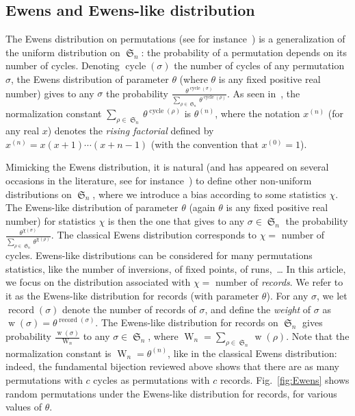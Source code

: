 \documentclass[proceedings]{aofa}
\DeclareMathOperator{\sym}{\mathfrak{S}}
\DeclareMathOperator{\weight}{w}
\DeclareMathOperator{\Weight}{W}
\DeclareMathOperator{\cyc}{cycle}
\DeclareMathOperator{\rec}{record}
\newcommand{\rfact}[2]{#1^{(#2)}}
\begin{document}
\subsection{Ewens and Ewens-like distribution}

The Ewens distribution on permutations (see for instance~\cite[Ch. 4 \& 5]{Arratia}) is a generalization of the uniform distribution on $\sym_{n}$: 
the probability of a permutation depends on its number of cycles. 
Denoting $\cyc(\sigma)$ the number of cycles of any permutation $\sigma$, 
the Ewens distribution of parameter $\theta$ (where $\theta$ is any fixed positive real number) 
gives to any $\sigma$ the probability $\frac{\theta^{\cyc(\sigma)}}{\sum_{\rho\in\sym_{n}} \theta^{\cyc(\rho)}}$. 
As seen in~\cite[Ch. 5]{Arratia}, the normalization constant $\sum_{\rho\in\sym_{n}} \theta^{\cyc(\rho)}$ is $\rfact\theta n$, 
where the notation $\rfact{x}{n}$ (for any real $x$) denotes the \emph{rising factorial} defined by
$\rfact{x}{n}=x(x + 1)\cdots(x + n-1)$ (with the convention that $\rfact{x}{0}=1$).

Mimicking the Ewens distribution, it is natural (and has appeared on several occasions in the literature, see for instance~\cite[Example 12]{Borodin}) 
to define other non-uniform distributions on $\sym_{n}$, 
where we introduce a bias according to some statistics $\chi$. 
The Ewens-like distribution of parameter $\theta$ (again $\theta$ is any fixed positive real number) 
for statistics $\chi$ 
is then the one that gives to any $\sigma \in \sym_n$ the probability $\frac{\theta^{\chi(\sigma)}}{\sum_{\rho\in\sym_{n}} \theta^{\chi(\rho)}}$. 
The classical Ewens distribution corresponds to $\chi = $ number of cycles. 
Ewens-like distributions can be considered for many permutations statistics, like the number of inversions, of fixed points, of runs,~\dots 
In this article, we focus on the distribution associated with $\chi = $ number of \emph{records}. 
We refer to it as the Ewens-like distribution for records (with parameter $\theta$).
For any $\sigma$, we let $\rec(\sigma)$ denote the number of records of $\sigma$, and define the \emph{weight} of $\sigma$ as $\weight(\sigma)=\theta^{\rec(\sigma)}$. 
The Ewens-like distribution for records on $\sym_{n}$ gives probability $\frac{\weight(\sigma)}{\Weight_{n}}$ to any $\sigma \in \sym_{n}$, 
where $\Weight_{n}=\sum_{\rho\in\sym_{n}} \weight(\rho)$. 
Note that the normalization constant is $\Weight_{n} =\rfact\theta n $, like in the classical Ewens distribution: 
indeed, the fundamental bijection reviewed above 
shows that there are as many permutations with $c$ cycles as permutations with $c$ records. 
Fig.~\ref{fig:Ewens} shows random permutations under the Ewens-like distribution for records, for various values of $\theta$. 
\end{document}
